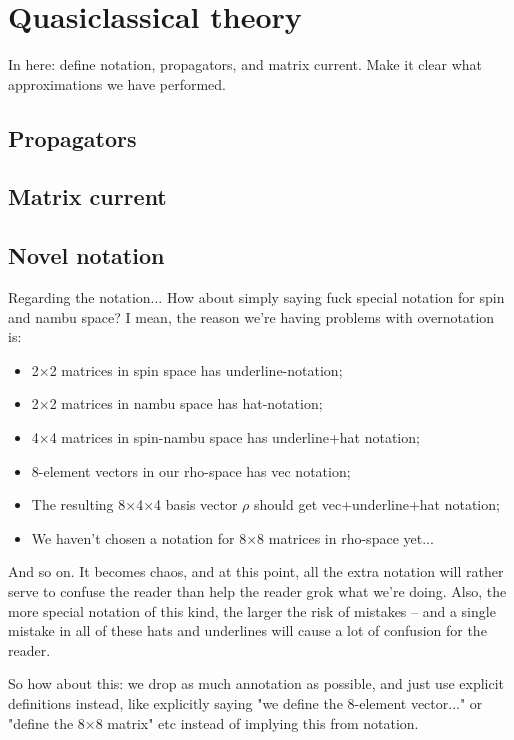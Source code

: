 \chapter{Quasiclassical theory}
In here: define notation, propagators, and matrix current.
Make it clear what approximations we have performed.

\section{Propagators}
\section{Matrix current}

\section{Novel notation}
Regarding the notation... How about simply saying fuck special notation for spin and nambu space? I mean, the reason we're having problems with overnotation is:
\begin{itemize}
  \item 2×2 matrices in spin space has underline-notation;
  \item 2×2 matrices in nambu space has hat-notation;
  \item 4×4 matrices in spin-nambu space has underline+hat notation;
  \item 8-element vectors in our rho-space has vec notation;
  \item The resulting 8×4×4 basis vector $\rho$ should get vec+underline+hat notation;
  \item We haven't chosen a notation for 8×8 matrices in rho-space yet...
\end{itemize}
And so on. It becomes chaos, and at this point, all the extra notation will rather serve to confuse the reader than help the reader grok what we're doing. Also,
the more special notation of this kind, the larger the risk of mistakes -- and a single mistake in all of these hats and underlines will cause a lot of confusion for the reader.

So how about this: we drop as much annotation as possible, and just use explicit definitions instead, like explicitly saying "we define the 8-element vector..." or "define the 8×8 matrix" etc instead of implying this from notation.

